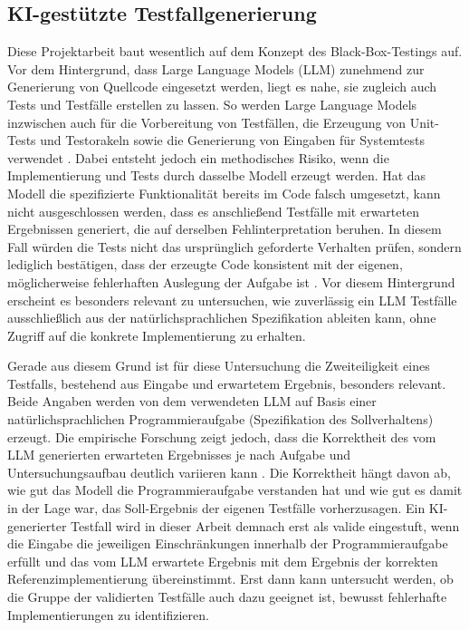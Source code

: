 \subsection{\acs{KI}-gestützte Testfallgenerierung}
Diese Projektarbeit baut wesentlich auf dem Konzept des Black-Box-Testings auf. Vor dem Hintergrund, 
dass Large Language Models (\acs{LLM}) zunehmend zur Generierung von Quellcode eingesetzt werden, liegt es nahe, 
sie zugleich auch Tests und Testfälle erstellen zu lassen.
So werden Large Language Models inzwischen auch für die Vorbereitung von
Testfällen, die Erzeugung von Unit-Tests und Testorakeln sowie die Generierung von Eingaben für
Systemtests verwendet \cite{wang_software_2024}.
Dabei entsteht jedoch ein methodisches Risiko, wenn die Implementierung und Tests durch dasselbe 
Modell erzeugt werden. Hat das Modell die spezifizierte Funktionalität bereits im Code falsch 
umgesetzt, kann nicht ausgeschlossen werden, dass es anschließend Testfälle mit erwarteten 
Ergebnissen generiert, die auf derselben Fehlinterpretation beruhen. In diesem Fall würden die Tests 
nicht das ursprünglich geforderte Verhalten prüfen, sondern lediglich bestätigen, dass der erzeugte 
Code konsistent mit der eigenen, möglicherweise fehlerhaften Auslegung der Aufgabe ist \cite{caridad_modelinversion_2026}. 
Vor diesem Hintergrund erscheint es besonders relevant zu untersuchen, wie zuverlässig ein 
\ac{LLM} Testfälle ausschließlich aus der natürlichsprachlichen Spezifikation ableiten 
kann, ohne Zugriff auf die konkrete Implementierung zu erhalten.

Gerade aus diesem Grund ist für diese Untersuchung die Zweiteiligkeit eines Testfalls, bestehend aus Eingabe 
und erwartetem Ergebnis, besonders relevant. Beide Angaben werden von dem verwendeten \ac{LLM} 
auf Basis einer natürlichsprachlichen Programmieraufgabe (Spezifikation des Sollverhaltens) erzeugt.
Die empirische Forschung zeigt jedoch, dass die Korrektheit des vom 
\ac{LLM} generierten erwarteten Ergebnisses je nach Aufgabe und Untersuchungsaufbau deutlich variieren kann
\cite{wang_software_2024}. Die Korrektheit hängt davon ab, wie gut das Modell die Programmieraufgabe 
verstanden hat und wie gut es damit in der Lage war, das Soll-Ergebnis der eigenen Testfälle vorherzusagen.
Ein \ac{KI}-generierter Testfall wird in dieser Arbeit demnach erst als valide eingestuft, wenn die 
Eingabe die jeweiligen Einschränkungen innerhalb der Programmieraufgabe erfüllt und das vom \ac{LLM} 
erwartete Ergebnis mit dem Ergebnis der korrekten Referenzimplementierung übereinstimmt. 
Erst dann kann untersucht werden, ob die Gruppe der validierten Testfälle auch dazu geeignet ist, 
bewusst fehlerhafte Implementierungen zu identifizieren.

